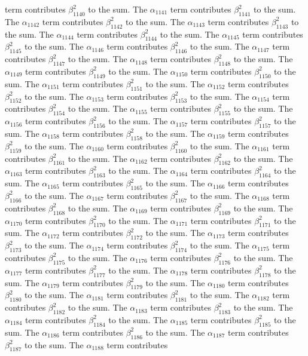 \begin{lemma}
term contributes $\beta_{1140}^{2}$ to the sum. The $\alpha_{1141}$ term contributes $\beta_{1141}^{2}$ to the sum. The $\alpha_{1142}$ term contributes $\beta_{1142}^{2}$ to the sum. The $\alpha_{1143}$ term contributes $\beta_{1143}^{2}$ to the sum. The $\alpha_{1144}$ term contributes $\beta_{1144}^{2}$ to the sum. The $\alpha_{1145}$ term contributes $\beta_{1145}^{2}$ to the sum. The $\alpha_{1146}$ term contributes $\beta_{1146}^{2}$ to the sum. The $\alpha_{1147}$ term contributes $\beta_{1147}^{2}$ to the sum. The $\alpha_{1148}$ term contributes $\beta_{1148}^{2}$ to the sum. The $\alpha_{1149}$ term contributes $\beta_{1149}^{2}$ to the sum. The $\alpha_{1150}$ term contributes $\beta_{1150}^{2}$ to the sum. The $\alpha_{1151}$ term contributes $\beta_{1151}^{2}$ to the sum. The $\alpha_{1152}$ term contributes $\beta_{1152}^{2}$ to the sum. The $\alpha_{1153}$ term contributes $\beta_{1153}^{2}$ to the sum. The $\alpha_{1154}$ term contributes $\beta_{1154}^{2}$ to the sum. The $\alpha_{1155}$ term contributes $\beta_{1155}^{2}$ to the sum. The $\alpha_{1156}$ term contributes $\beta_{1156}^{2}$ to the sum. The $\alpha_{1157}$ term contributes $\beta_{1157}^{2}$ to the sum. The $\alpha_{1158}$ term contributes $\beta_{1158}^{2}$ to the sum. The $\alpha_{1159}$ term contributes $\beta_{1159}^{2}$ to the sum. The $\alpha_{1160}$ term contributes $\beta_{1160}^{2}$ to the sum. The $\alpha_{1161}$ term contributes $\beta_{1161}^{2}$ to the sum. The $\alpha_{1162}$ term contributes $\beta_{1162}^{2}$ to the sum. The $\alpha_{1163}$ term contributes $\beta_{1163}^{2}$ to the sum. The $\alpha_{1164}$ term contributes $\beta_{1164}^{2}$ to the sum. The $\alpha_{1165}$ term contributes $\beta_{1165}^{2}$ to the sum. The $\alpha_{1166}$ term contributes $\beta_{1166}^{2}$ to the sum. The $\alpha_{1167}$ term contributes $\beta_{1167}^{2}$ to the sum. The $\alpha_{1168}$ term contributes $\beta_{1168}^{2}$ to the sum. The $\alpha_{1169}$ term contributes $\beta_{1169}^{2}$ to the sum. The $\alpha_{1170}$ term contributes $\beta_{1170}^{2}$ to the sum. The $\alpha_{1171}$ term contributes $\beta_{1171}^{2}$ to the sum. The $\alpha_{1172}$ term contributes $\beta_{1172}^{2}$ to the sum. The $\alpha_{1173}$ term contributes $\beta_{1173}^{2}$ to the sum. The $\alpha_{1174}$ term contributes $\beta_{1174}^{2}$ to the sum. The $\alpha_{1175}$ term contributes $\beta_{1175}^{2}$ to the sum. The $\alpha_{1176}$ term contributes $\beta_{1176}^{2}$ to the sum. The $\alpha_{1177}$ term contributes $\beta_{1177}^{2}$ to the sum. The $\alpha_{1178}$ term contributes $\beta_{1178}^{2}$ to the sum. The $\alpha_{1179}$ term contributes $\beta_{1179}^{2}$ to the sum. The $\alpha_{1180}$ term contributes $\beta_{1180}^{2}$ to the sum. The $\alpha_{1181}$ term contributes $\beta_{1181}^{2}$ to the sum. The $\alpha_{1182}$ term contributes $\beta_{1182}^{2}$ to the sum. The $\alpha_{1183}$ term contributes $\beta_{1183}^{2}$ to the sum. The $\alpha_{1184}$ term contributes $\beta_{1184}^{2}$ to the sum. The $\alpha_{1185}$ term contributes $\beta_{1185}^{2}$ to the sum. The $\alpha_{1186}$ term contributes $\beta_{1186}^{2}$ to the sum. The $\alpha_{1187}$ term contributes $\beta_{1187}^{2}$ to the sum. The $\alpha_{1188}$ term contributes 
\end{lemma}
